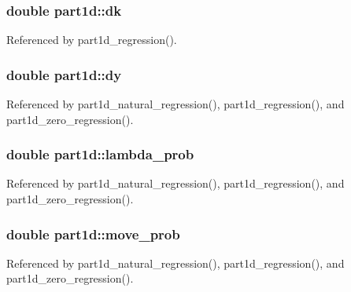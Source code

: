 \subsubsection[{\texorpdfstring{dk}{dk}}]{\setlength{\rightskip}{0pt plus 5cm}double part1d\+::dk}\hypertarget{structpart1d_a6db1dbd38a9eca03cd4e4c8cc94db05d}{}\label{structpart1d_a6db1dbd38a9eca03cd4e4c8cc94db05d}


Referenced by part1d\+\_\+regression().

\subsubsection[{\texorpdfstring{dy}{dy}}]{\setlength{\rightskip}{0pt plus 5cm}double part1d\+::dy}\hypertarget{structpart1d_aafa6be49ab86fbb50af3e97da908a491}{}\label{structpart1d_aafa6be49ab86fbb50af3e97da908a491}


Referenced by part1d\+\_\+natural\+\_\+regression(), part1d\+\_\+regression(), and part1d\+\_\+zero\+\_\+regression().

\subsubsection[{\texorpdfstring{lambda\+\_\+prob}{lambda_prob}}]{\setlength{\rightskip}{0pt plus 5cm}double part1d\+::lambda\+\_\+prob}\hypertarget{structpart1d_a5dc8a6d2217c23f6aff289b53bc1ca54}{}\label{structpart1d_a5dc8a6d2217c23f6aff289b53bc1ca54}


Referenced by part1d\+\_\+natural\+\_\+regression(), part1d\+\_\+regression(), and part1d\+\_\+zero\+\_\+regression().

\subsubsection[{\texorpdfstring{move\+\_\+prob}{move_prob}}]{\setlength{\rightskip}{0pt plus 5cm}double part1d\+::move\+\_\+prob}\hypertarget{structpart1d_a271ac59decb44606da24c8b7301b9096}{}\label{structpart1d_a271ac59decb44606da24c8b7301b9096}


Referenced by part1d\+\_\+natural\+\_\+regression(), part1d\+\_\+regression(), and part1d\+\_\+zero\+\_\+regression().

